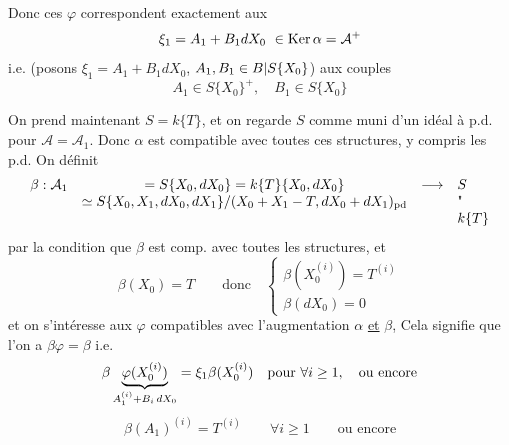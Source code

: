 Donc ces $\varphi$ correspondent exactement aux
\[
\xi_1\deleted{{}=A_1+B_1dX_0}\ \in\operatorname{Ker}\alpha=\mathcal A^+
\]
i.e.  (posons $\xi_1=A_1+B_1dX_0$, $A_1,B_1\in{B|S}\{X_0\}$)
aux couples
\[
A_1\in S\{X_0\}^{+},\quad B_1\in S\{X_0\}
\]


On prend maintenant $S=k\{T\}$, et
on regarde $S$ comme muni d'un idéal à
p.d.  pour $\mathcal A=\mathcal A_1$. Donc $\alpha$ est
compatible avec toutes ces structures, y
compris les p.d. On définit
\[
\begin{array}{rcll}
\beta:\mathcal A_1&=S\{X_0,dX_0\}=k\{T\}\{X_0,dX_0\}&\longrightarrow&S\\
&\simeq S\{X_0,X_1,dX_0,dX_1\}/(X_0+X_1-T,dX_0+dX_1)_{\mathrm{pd}}&&\text{\textquotedbl}\\
&&&k\{T\}
\end{array}
\]
par la condition que $\beta$ est comp. avec
toutes les structures, et
\[
\beta(X_0)=T\qquad\text{donc}\quad
\begin{cases}\beta(X_0^{(i)})=T^{(i)}\\\beta(dX_0)=0\end{cases}
\]
et on s'intéresse aux $\varphi$  compatibles
avec l'augmentation $\alpha$ \uline{et} $\beta$, Cela
signifie que l'on a $\beta\varphi=\beta$ i.e.
\[
\beta\underbrace{\varphi(X_0^{(i)})}_{A_1^{(i)}+B_i\,dX_0}
={{\xi_1}}\beta(X_0^{(i)})\quad\text{pour }\forall i\geq1,\quad\text{ou encore}
\]
\[
\beta(A_1)^{(i)}=T^{(i)}\qquad\forall i\geq1\qquad\text{ou encore}
\]
